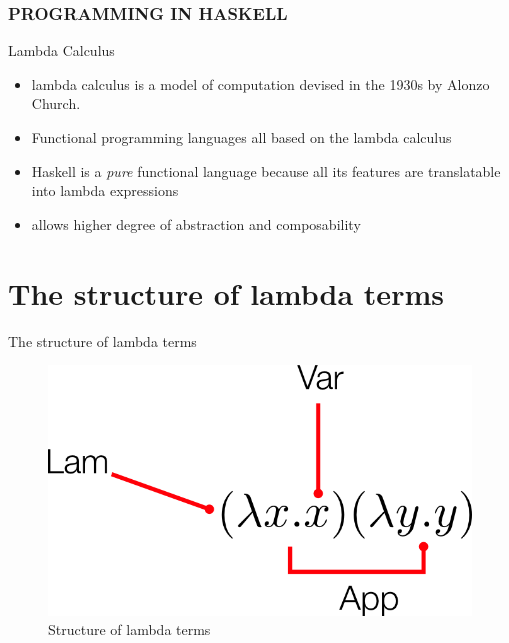 \documentclass{beamer}
\begin{document}
\begin{frame}       
 \frametitle{PROGRAMMING IN HASKELL}
    \begin{figure}
    \end{figure}

\end{frame}

\begin{frame}{Lambda Calculus}
    \begin{itemize}
        \item lambda calculus is  a model of computation devised in the 1930s by Alonzo Church.
        \item Functional programming languages all based on the lambda calculus
        \item Haskell is a \textit{pure} functional language because all its features are translatable into lambda expressions
        \item allows higher degree of abstraction and composability
        \end{itemize}
        
         
\end{frame}
\section{The structure of lambda terms}
\begin{frame}{The structure of lambda terms}
\begin{figure} [H]
	\centering
	\includegraphics[width=.6\textwidth]{img/01.png}
	\caption{Structure of lambda terms}
	\label{fig:funcapp}
\end{figure}  
\end{frame}
\end{document}
